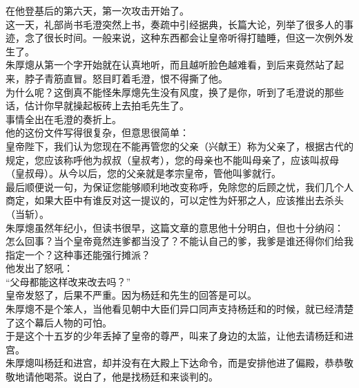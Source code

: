 \begin{multicols}{\theparacolNo}
在他登基后的第六天，第一次攻击开始了。\\

这一天，礼部尚书毛澄突然上书，奏疏中引经据典，长篇大论，列举了很多人的事迹，念了很长时间。一般来说，这种东西都会让皇帝听得打瞌睡，但这一次例外发生了。\\

朱厚熜从第一个字开始就在认真地听，而且越听脸色越难看，到后来竟然站了起来，脖子青筋直冒。怒目盯着毛澄，恨不得撕了他。\\

为什么呢？这倒真不能怪朱厚熜先生没有风度，换了是你，听到了毛澄说的那些话，估计你早就操起板砖上去拍毛先生了。\\

事情全出在毛澄的奏折上。\\

他的这份文件写得很复杂，但意思很简单：\\

皇帝陛下，我们认为您现在不能再管您的父亲（兴献王）称为父亲了，根据古代的规定，您应该称呼他为叔叔（皇叔考），您的母亲也不能叫母亲了，应该叫叔母（皇叔母）。从今以后，您的父亲就是孝宗皇帝，管他叫爹就行。\\

最后顺便说一句，为保证您能够顺利地改变称呼，免除您的后顾之忧，我们几个人商定，如果大臣中有谁反对这一提议的，可以定性为奸邪之人，应该推出去杀头（当斩）。\\

朱厚熜虽然年纪小，但读书很早，这篇文章的意思他十分明白，但也十分纳闷：\\

怎么回事？当个皇帝竟然连爹都当没了？不能认自己的爹，我爹是谁还得你们给我指定一个？这种事还能强行摊派？\\

他发出了怒吼：\\

“父母都能这样改来改去吗？”\\

皇帝发怒了，后果不严重。因为杨廷和先生的回答是可以。\\

朱厚熜不是个笨人，当他看见朝中大臣们异口同声支持杨廷和的时候，就已经清楚了这个幕后人物的可怕。\\

于是这个十五岁的少年丢掉了皇帝的尊严，叫来了身边的太监，让他去请杨廷和进宫。\\

朱厚熜叫杨廷和进宫，却并没有在大殿上下达命令，而是安排他进了偏殿，恭恭敬敬地请他喝茶。说白了，他是找杨廷和来谈判的。\\


\end{multicols}
